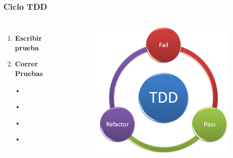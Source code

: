 \documentclass{beamer}
\begin{document}
\begin{frame}
\frametitle{Ciclo TDD}
\begin{columns}[c] %

\begin{enumerate}
\item \textbf{Escribir prueba}
\item {\color{red}\textbf{Correr Pruebas}}
\item[•]	
\item[•]	
\item[•]	
\item[•]	
\end{enumerate}

\begin{figure}
\includegraphics[width=0.9\linewidth]{tdd.png}
\end{figure}
\end{columns}
\end{frame}
\end{document}
